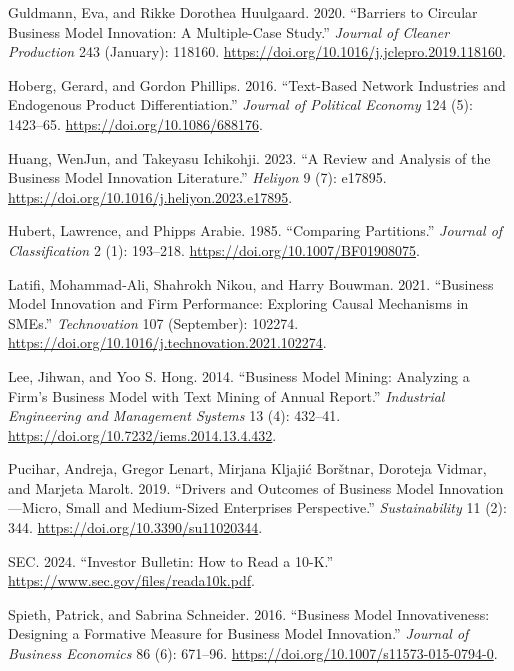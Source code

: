 \documentclass[
]{article}
\newlength{\cslhangindent}
\newenvironment{CSLReferences}[2] %
 {\begin{list}{}{%
  \setlength{\itemindent}{0pt}
  \setlength{\leftmargin}{0pt}
  \setlength{\parsep}{0pt}
  \ifodd #1
   \setlength{\leftmargin}{\cslhangindent}
   \setlength{\itemindent}{-1\cslhangindent}
  \fi
  \setlength{\itemsep}{#2\baselineskip}}}
 {\end{list}}
\begin{document}
\begin{CSLReferences}{1}{0}
Guldmann, Eva, and Rikke Dorothea Huulgaard. 2020. {``Barriers to
Circular Business Model Innovation: {A} Multiple-Case Study.''}
\emph{Journal of Cleaner Production} 243 (January): 118160.
\url{https://doi.org/10.1016/j.jclepro.2019.118160}.

Hoberg, Gerard, and Gordon Phillips. 2016. {``Text-{Based} {Network}
{Industries} and {Endogenous} {Product} {Differentiation}.''}
\emph{Journal of Political Economy} 124 (5): 1423--65.
\url{https://doi.org/10.1086/688176}.

Huang, WenJun, and Takeyasu Ichikohji. 2023. {``A Review and Analysis of
the Business Model Innovation Literature.''} \emph{Heliyon} 9 (7):
e17895. \url{https://doi.org/10.1016/j.heliyon.2023.e17895}.

Hubert, Lawrence, and Phipps Arabie. 1985. {``Comparing Partitions.''}
\emph{Journal of Classification} 2 (1): 193--218.
\url{https://doi.org/10.1007/BF01908075}.

Latifi, Mohammad-Ali, Shahrokh Nikou, and Harry Bouwman. 2021.
{``Business Model Innovation and Firm Performance: {Exploring} Causal
Mechanisms in {SMEs}.''} \emph{Technovation} 107 (September): 102274.
\url{https://doi.org/10.1016/j.technovation.2021.102274}.

Lee, Jihwan, and Yoo S. Hong. 2014. {``Business {Model} {Mining}:
{Analyzing} a {Firm}'s {Business} {Model} with {Text} {Mining} of
{Annual} {Report}.''} \emph{Industrial Engineering and Management
Systems} 13 (4): 432--41.
\url{https://doi.org/10.7232/iems.2014.13.4.432}.

Pucihar, Andreja, Gregor Lenart, Mirjana Kljajić Borštnar, Doroteja
Vidmar, and Marjeta Marolt. 2019. {``Drivers and {Outcomes} of
{Business} {Model} {Innovation}---{Micro}, {Small} and {Medium}-{Sized}
{Enterprises} {Perspective}.''} \emph{Sustainability} 11 (2): 344.
\url{https://doi.org/10.3390/su11020344}.

SEC. 2024. {``Investor {Bulletin}: {How} to {Read} a 10-{K}.''}
\url{https://www.sec.gov/files/reada10k.pdf}.

Spieth, Patrick, and Sabrina Schneider. 2016. {``Business Model
Innovativeness: Designing a Formative Measure for Business Model
Innovation.''} \emph{Journal of Business Economics} 86 (6): 671--96.
\url{https://doi.org/10.1007/s11573-015-0794-0}.


\end{CSLReferences}
\end{document}
